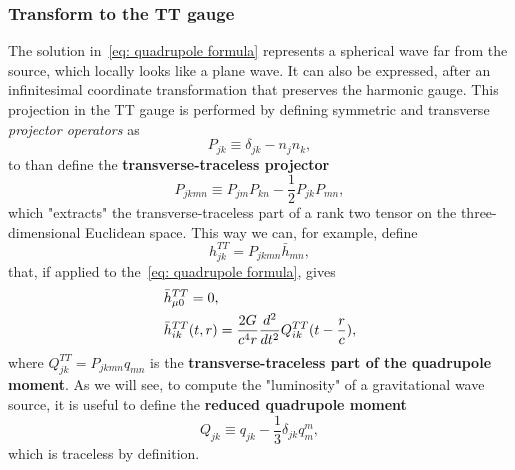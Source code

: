 \subsubsection{Transform to the TT gauge}
The solution in~\eqref{eq: quadrupole formula} represents a spherical wave far from the source, which locally looks like a plane wave.
It can also be expressed, after an infinitesimal coordinate transformation that preserves the harmonic gauge.
This projection in the TT gauge is performed by defining symmetric and transverse \textit{projector operators} as
\[
    P_{jk}\equiv \delta_{jk} - n_jn_k,
\]
to than define the \textbf{transverse-traceless projector} 
\begin{equation}
    P_{jkmn}\equiv P_{jm}P_{kn}-\frac{1}{2}P_{jk}P_{mn},
    \label{eq: transverse-traceless projector}
\end{equation}
which "extracts" the transverse-traceless part of a rank two tensor on the three-dimensional Euclidean space.
This way we can, for example, define
\[
    h_{jk}^{TT} = P_{jkmn}\bar{h}_{mn},
\]
that, if applied to the~\eqref{eq: quadrupole formula}, gives
\begin{align}
   &\bar{h}^{TT}_{\mu 0} =0,\notag\\
   &\bar{h}^{TT}_{ik}(t,r) = \frac{2G}{c^4r}\frac{d^2}{dt^2}Q^{TT}_{ik}(t-\frac{r}{c}),
   \label{eq: TT part of quadrupole moment}
\end{align}
where $Q_{jk}^{TT} = P_{jkmn}q_{mn}$ is the \textbf{transverse-traceless part of the quadrupole moment}.
As we will see, to compute the "luminosity" of a gravitational wave source, it is useful to define the \textbf{reduced quadrupole moment}
\begin{equation}
    Q_{jk} \equiv q_{jk} - \frac{1}{3}\delta_{jk}q_m^m, 
    \label{eq: reduced quadrupole moment}
\end{equation}
which is traceless by definition.

